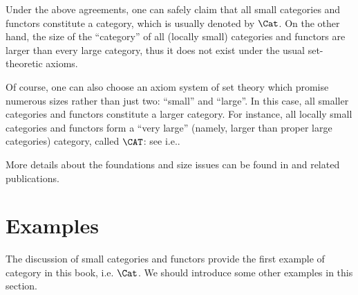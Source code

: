     Under the above agreements, one can safely claim that all small categories and functors constitute a category, which is usually denoted by $\Cat$.
    On the other hand, the size of the ``category'' of all (locally small) categories and functors are larger than every large category, thus it does not exist under the usual set-theoretic axioms.

    Of course, one can also choose an axiom system of set theory which promise numerous sizes rather than just two: ``small'' and ``large''. In this case, all smaller categories and functors constitute a larger category. For instance, all locally small categories and functors form a ``very large'' (namely, larger than proper large categories) category, called $\CAT$: see \hrefacc i.e.\cite{acc}.

    More details about the foundations and size issues can be found in \nlab and related publications.

\newpage\section{Examples}
  The discussion of small categories and functors provide the first example of category in this book, i.e. $\Cat$. We should introduce some other examples in this section.

